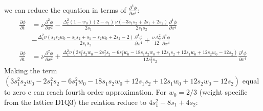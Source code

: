 \documentclass[letterpaper,10pt,english,openany,oneside]{jupyterBook}
\begin{document}
\sphinxAtStartPar
we can reduce the equation in terms of \(\frac{\partial^{4}\phi}{\partial x^{4}}\):
\begin{equation*}
\begin{split}
\begin{array}{rl}
\displaystyle\frac{\partial \phi}{\partial t} & = \nu \displaystyle\frac{\partial^{2}\phi}{\partial x^{2}} - \frac{\Delta_{x}^{2} (1-w_{0})\left(2 - s_{1}\right)}{2 s_{1} }\frac{\nu \left(- 3 s_{1} s_{2} + 2 s_{1} + 2 s_{2}\right)}{2 s_{1} s_{2}} \frac{\partial^{4}\phi}{\partial x^{4}}  \\
&- \displaystyle\frac{ \Delta_{x}^{2} \nu \left(s_{1} s_{2} w_{0} - s_{1} s_{2} + s_{1} - s_{2} w_{0} + 2 s_{2} - 2\right)}{2 s_{1} s_{2}} \frac{\partial^{4}\phi}{\partial x^{4}} + \frac{\nu\Delta_{x}^{2}}{12} \frac{\partial^{4}\phi}{\partial x^{4}}\\
\displaystyle\frac{\partial \phi}{\partial t} & = \nu \displaystyle\frac{\partial^{2}\phi}{\partial x^{2}} + \frac{\Delta_{x}^{2} \nu \left(3 s_{1}^{2} s_{2} w_{0} - 2 s_{1}^{2} s_{2} - 6 s_{1}^{2} w_{0} - 18 s_{1} s_{2} w_{0} + 12 s_{1} s_{2} + 12 s_{1} w_{0} + 12 s_{2} w_{0} - 12 s_{2}\right)}{12 s_{1}^{2} s_{2}} \frac{\partial^{4}\phi}{\partial x^{4}}
\end{array}
\end{split}
\end{equation*}
\sphinxAtStartPar
Making the term \(\left(3 s_{1}^{2} s_{2} w_{0} - 2 s_{1}^{2} s_{2} - 6 s_{1}^{2} w_{0} - 18 s_{1} s_{2} w_{0} + 12 s_{1} s_{2} + 12 s_{1} w_{0} + 12 s_{2} w_{0} - 12 s_{2}\right)\) equal to zero e can reach fourth order approximation. For \(w_{0}=2/3\) (weight specific from the lattice D1Q3) the relation reduce to \(4s_{1}^{2} -8s_{1}+4s_{2}\):
\end{document}
